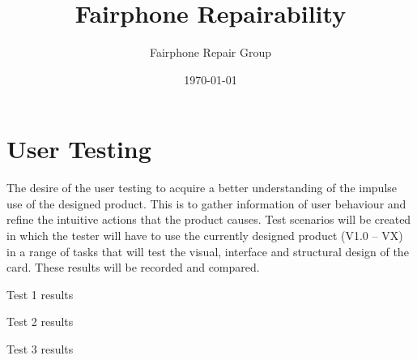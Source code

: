 \documentclass[final,a4paper]{report} %
\author{Fairphone Repair Group}
\title{Fairphone Repairability}
\date{\today}
\begin{document}
	\section{User Testing}
	\label{sec:scrw-it-user-testing}
	The desire of the user testing to acquire a better understanding of the impulse use of the designed product. This is to gather information of user behaviour and refine the intuitive actions that the product causes. Test scenarios will be created in which the tester will have to use the currently designed product (V1.0 – VX) in a range of tasks that will test the visual, interface and structural design of the card. These results will be recorded and compared.
	
	Test 1 results
	
	Test 2 results
	
	Test 3 results
\end{document}
